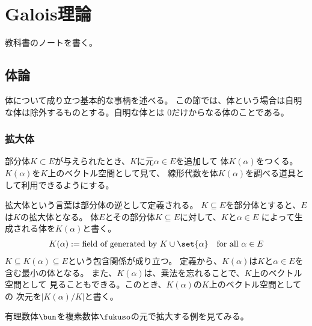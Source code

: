 {\section{Galois理論}\label{s1:Galois理論} %
	教科書\cite{artin1959}のノートを書く。
\subsection{体論}\label{s2:体論} %
	体について成り立つ基本的な事柄を述べる。
	この節では、体という場合は自明な体は除外するものとする。自明な体とは
	$0$だけからなる体のことである。
\subsubsection{拡大体}\label{s3:拡大体} %
	\begin{minipage}{0.9\hsize}{\small
		部分体$K\subset E$が与えられたとき、$K$に元$\alpha\in E$を追加して
		体$K(\alpha)$をつくる。$K(\alpha)$を$K$上のベクトル空間として見て、
		線形代数を体$K(\alpha)$を調べる道具として利用できるようにする。
	}\end{minipage}\medskip

	拡大体という言葉は部分体の逆として定義される。
	$K\subseteq E$を部分体とすると、$E$は$K$の拡大体となる。
	体$E$とその部分体$K\subseteq E$に対して、$K$と$\alpha\in E$
	によって生成される体を$K(\alpha)$と書く。
	\begin{equation*}\begin{split}
		K(\alpha) := \text{field of generated by }K\cup\set{\alpha}
		\quad\text{for all } \alpha\in E
	\end{split}\end{equation*}
	$K\subseteq K(\alpha)\subseteq E$という包含関係が成り立つ。
	定義から、$K(\alpha)$は$K$と$\alpha\in E$を含む最小の体となる。
	また、$K(\alpha)$は、乗法を忘れることで、$K$上のベクトル空間として
	見ることもできる。このとき、$K(\alpha)$の$K$上のベクトル空間としての
	次元を$|K(\alpha)/K|$と書く。

	有理数体$\bun$を複素数体$\fukuso$の元で拡大する例を見てみる。

}
